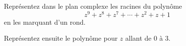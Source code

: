 \begin{exercice}\label{exoMatlab0009}

	Représentez dans le plan complexe les racines du polynôme
	\begin{equation}
		z^9+z^8+z^7+\cdots+z^2+z+1
	\end{equation}
	en les marquant d'un rond.

	Représentez ensuite le polynôme pour $z$ allant de 0 à 3.

\end{exercice}
